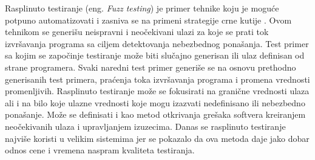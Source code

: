 \documentclass[12pt,oneside]{memoir}
\begin{document}
Rasplinuto testiranje (eng. \textit{Fuzz testing}) je primer tehnike koju je moguće potpuno automatizovati i zasniva se na primeni strategije crne kutije \cite{FuzzTestingForDummies}. Ovom tehnikom se generišu neispravni i neočekivani ulazi za koje se prati tok izvršavanja programa sa ciljem detektovanja nebezbednog ponašanja. Test primer sa kojim se započinje testiranje može biti slučajno generisan ili ulaz definisan od strane programera. Svaki naredni test primer generiše se na osnovu prethodno generisanih test primera, praćenja toka izvršavanja programa i promena vrednosti promenljivih. Rasplinuto testiranje može se fokusirati na granične vrednosti ulaza ali i na bilo koje ulazne vrednosti koje mogu izazvati nedefinisano ili nebezbedno ponašanje. Može se definisati i kao metod otkrivanja grešaka softvera kreiranjem neočekivanih ulaza i upravljanjem izuzecima. Danas se rasplinuto testiranje najviše koristi u velikim sistemima jer se pokazalo da ova metoda daje jako dobar odnos cene i vremena naspram kvaliteta testiranja. 
\par
\end{document}
